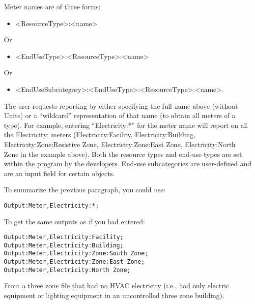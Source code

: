 Meter names are of three forms:

\begin{itemize}
\tightlist
\item
  \textless{}ResourceType\textgreater{}:\textless{}name\textgreater{}
\end{itemize}

Or

\begin{itemize}
\tightlist
\item
  \textless{}EndUseType\textgreater{}:\textless{}ResourceType\textgreater{}:\textless{}name\textgreater{}
\end{itemize}

Or

\begin{itemize}
\tightlist
\item
  \textless{}EndUseSubcategory\textgreater{}:\textless{}EndUseType\textgreater{}:\textless{}ResourceType\textgreater{}:\textless{}name\textgreater{}.
\end{itemize}

The user requests reporting by either specifying the full name above (without Units) or a ``wildcard'' representation of that name (to obtain all meters of a type). For example, entering ``Electricity:*'' for the meter name will report on all the Electricity: meters (Electricity:Facility, Electricity:Building, Electricity:Zone:Resistive Zone, Electricity:Zone:East Zone, Electricity:North Zone in the example above). Both the resource types and end-use types are set within the program by the developers. End-use subcategories are user-defined and are an input field for certain objects.

To summarize the previous paragraph, you could use:

\begin{lstlisting}
Output:Meter,Electricity:*;
\end{lstlisting}

To get the same outputs as if you had entered:

\begin{lstlisting}
Output:Meter,Electricity:Facility;
Output:Meter,Electricity:Building;
Output:Meter,Electricity:Zone:South Zone;
Output:Meter,Electricity:Zone:East Zone;
Output:Meter,Electricity:North Zone;
\end{lstlisting}

From a three zone file that had no HVAC electricity (i.e., had only electric equipment or lighting equipment in an uncontrolled three zone building).

